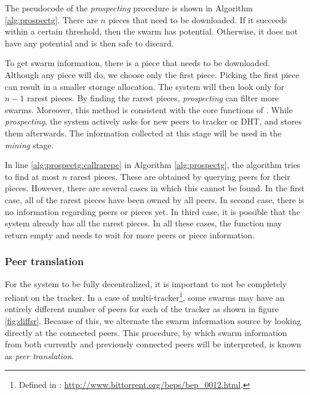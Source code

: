 The pseudocode of the \textit{prospecting} procedure is shown in Algorithm \ref{alg:prospectg}. There are $n$ pieces that need to be downloaded. If it succeeds within a certain threshold, then the swarm has potential. Otherwise, it does not have any potential and is then safe to discard. 

To get swarm information, there is a piece that needs to be downloaded. Although any piece will do, we choose only the first piece. Picking the first piece can result in a smaller storage allocation. The system will then look only for $n - 1$ rarest pieces. By finding the rarest pieces, \textit{prospecting} can filter more swarms. Moreover, this method is consistent with the core functions of \bt. While \textit{prospecting}, the system actively asks for new peers to tracker or DHT, and stores them afterwards. The information collected at this stage will be used in the \textit{mining} stage. 


In line \ref{alg:prospectg:callrarepc} in Algorithm \ref{alg:prospectg}, the algorithm tries to find  at most $n$ rarest pieces. These are obtained by querying peers for their pieces. However, there are several cases in which this cannot be found. In the first case, all of the rarest pieces have been owned by all peers. In second case, there is no information regarding peers or pieces yet. In third case, it is possible that the system already has all the rarest pieces. In all these cases, the function may return empty and needs to wait for more peers or piece information.

\subsubsection{Peer translation}
For the system to be fully decentralized, it is important to not be completely reliant on the tracker. In a case of multi-tracker\footnote{Defined in : \url{http://www.bittorrent.org/beps/bep_0012.html}.}, some swarms may have an entirely different number of peers for each of the tracker as shown in figure \ref{fig:diffsr}. Because of this, we alternate the swarm information source by looking directly at the connected peers. This procedure, by which swarm information from both currently and previously connected peers will be interpreted, is known as \textit{peer translation}. 

